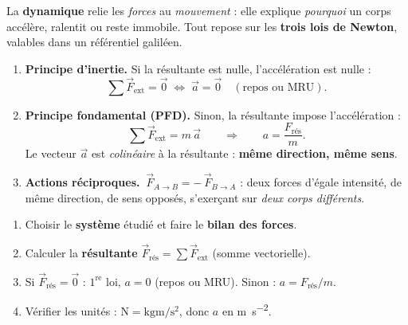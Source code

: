 \documentclass[11pt,a4paper]{article}
\newcommand{\vv}[1]{\vec{#1}}\newcommand{\ds}{\displaystyle}
\begin{document}

\noindent La \textbf{dynamique} relie les \emph{forces} au \emph{mouvement} : elle explique
\emph{pourquoi} un corps accélère, ralentit ou reste immobile. Tout repose sur les
\textbf{trois lois de Newton}, valables dans un référentiel galiléen.

\begin{cle}
\begin{enumerate}[label=\textbf{\arabic*.},leftmargin=1.7em,itemsep=3pt]
  \item \textbf{Principe d'inertie.} Si la résultante est nulle, l'accélération est nulle :
        \[ \sum\vv F_{\text{ext}}=\vv 0 \;\Longleftrightarrow\; \vv a=\vv 0
           \quad(\text{repos ou MRU}). \]
  \item \textbf{Principe fondamental (PFD).} Sinon, la résultante impose l'accélération :
        \[ \sum\vv F_{\text{ext}}=m\,\vv a \qquad\Longrightarrow\qquad a=\frac{F_{\text{rés}}}{m}. \]
        Le vecteur $\vv a$ est \emph{colinéaire} à la résultante : \textbf{même direction, même sens}.
  \item \textbf{Actions réciproques.} $\ \vv F_{A\to B}=-\,\vv F_{B\to A}$ : deux forces d'égale
        intensité, de même direction, de sens opposés, s'exerçant sur \emph{deux corps différents}.
\end{enumerate}
\end{cle}

\begin{methode}
\begin{enumerate}[label=\arabic*),leftmargin=1.7em,topsep=2pt,itemsep=1.5pt]
  \item Choisir le \textbf{système} étudié et faire le \textbf{bilan des forces}.
  \item Calculer la \textbf{résultante} $\vv F_{\text{rés}}=\sum\vv F_{\text{ext}}$ (somme vectorielle).
  \item Si $\vv F_{\text{rés}}=\vv 0$ : $1^{\text{re}}$ loi, $a=0$ (repos ou MRU). Sinon : $a=F_{\text{rés}}/m$.
  \item Vérifier les unités : $\si{\newton}=\si{\kilogram\metre\per\second\squared}$, donc $a$ en \si{\metre\per\second\squared}.
\end{enumerate}
\end{methode}

\begin{center}
\end{center}
\end{document}
